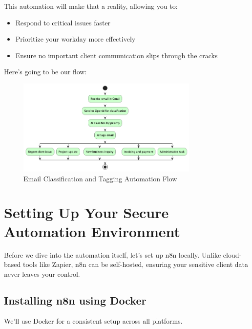 This automation will make that a reality, allowing you to:
\begin{itemize}
    \item Respond to critical issues faster
    \item Prioritize your workday more effectively
    \item Ensure no important client communication slips through the cracks
\end{itemize}

Here's going to be our flow:

\begin{figure}
    \centering
    \includegraphics[width=0.8\textwidth]{./figures/01-n8n-flow}
    \caption{Email Classification and Tagging Automation Flow}
    \label{fig:01_email_automation}
\end{figure}


\section{Setting Up Your Secure Automation Environment}

Before we dive into the automation itself, let's set up n8n locally. Unlike cloud-based tools like Zapier, n8n can be self-hosted, ensuring your sensitive client data never leaves your control.

\subsection{Installing n8n using Docker}

We'll use Docker for a consistent setup across all platforms.

